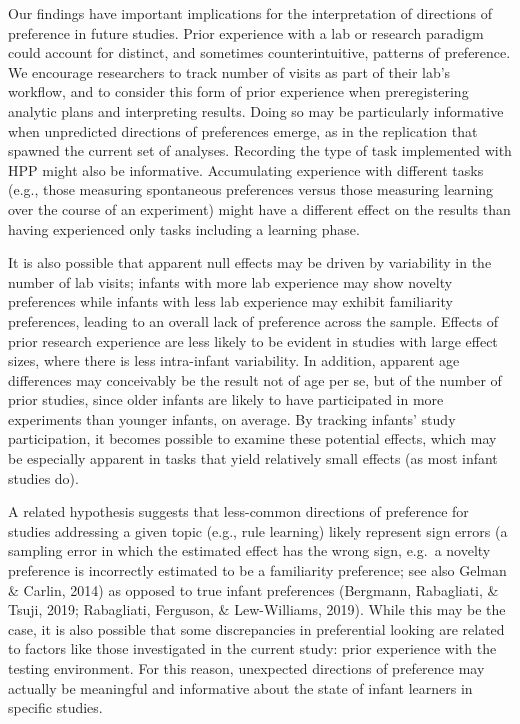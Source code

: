 \documentclass[
  english,
  man,man,floatsintext]{apa6}
\begin{document}
Our findings have important implications for the interpretation of directions of preference in future studies. Prior experience with a lab or research paradigm could account for distinct, and sometimes counterintuitive, patterns of preference. We encourage researchers to track number of visits as part of their lab's workflow, and to consider this form of prior experience when preregistering analytic plans and interpreting results. Doing so may be particularly informative when unpredicted directions of preferences emerge, as in the replication that spawned the current set of analyses. Recording the type of task implemented with HPP might also be informative. Accumulating experience with different tasks (e.g., those measuring spontaneous preferences versus those measuring learning over the course of an experiment) might have a different effect on the results than having experienced only tasks including a learning phase.

It is also possible that apparent null effects may be driven by variability in the number of lab visits; infants with more lab experience may show novelty preferences while infants with less lab experience may exhibit familiarity preferences, leading to an overall lack of preference across the sample. Effects of prior research experience are less likely to be evident in studies with large effect sizes, where there is less intra-infant variability. In addition, apparent age differences may conceivably be the result not of age per se, but of the number of prior studies, since older infants are likely to have participated in more experiments than younger infants, on average. By tracking infants' study participation, it becomes possible to examine these potential effects, which may be especially apparent in tasks that yield relatively small effects (as most infant studies do).

A related hypothesis suggests that less-common directions of preference for studies addressing a given topic (e.g., rule learning) likely represent sign errors (a sampling error in which the estimated effect has the wrong sign, e.g.~a novelty preference is incorrectly estimated to be a familiarity preference; see also Gelman \& Carlin, 2014) as opposed to true infant preferences (Bergmann, Rabagliati, \& Tsuji, 2019; Rabagliati, Ferguson, \& Lew-Williams, 2019). While this may be the case, it is also possible that some discrepancies in preferential looking are related to factors like those investigated in the current study: prior experience with the testing environment. For this reason, unexpected directions of preference may actually be meaningful and informative about the state of infant learners in specific studies.
\end{document}
